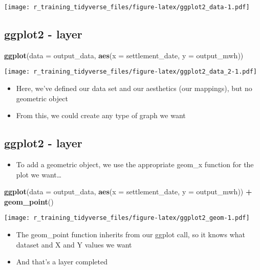 \documentclass[]{article}
\newenvironment{Shaded}{\begin{snugshade}}{\end{snugshade}}
\newcommand{\KeywordTok}[1]{\textcolor[rgb]{0.13,0.29,0.53}{\textbf{#1}}}
\newcommand{\DataTypeTok}[1]{\textcolor[rgb]{0.13,0.29,0.53}{#1}}
\newcommand{\StringTok}[1]{\textcolor[rgb]{0.31,0.60,0.02}{#1}}
\newcommand{\OperatorTok}[1]{\textcolor[rgb]{0.81,0.36,0.00}{\textbf{#1}}}
\newcommand{\NormalTok}[1]{#1}
\providecommand{\tightlist}{%
  \setlength{\itemsep}{0pt}\setlength{\parskip}{0pt}}
\begin{document}
\texttt{[image: r\_training\_tidyverse\_files/figure-latex/ggplot2\_data-1.pdf]}

\subsection{ggplot2 - layer}\label{ggplot2---layer-1}

\begin{Shaded}
\begin{Highlighting}[]
\KeywordTok{ggplot}\NormalTok{(}\DataTypeTok{data =}\NormalTok{ output_data, }\KeywordTok{aes}\NormalTok{(}\DataTypeTok{x =}\NormalTok{ settlement_date, }\DataTypeTok{y =}\NormalTok{ output_mwh))}
\end{Highlighting}
\end{Shaded}

\texttt{[image: r\_training\_tidyverse\_files/figure-latex/ggplot2\_data\_2-1.pdf]}

\begin{itemize}
\tightlist
\item
  Here, we've defined our data set and our aesthetics (our mappings),
  but no geometric object
\item
  From this, we could create any type of graph we want
\end{itemize}

\subsection{ggplot2 - layer}\label{ggplot2---layer-2}

\begin{itemize}
\tightlist
\item
  To add a geometric object, we use the appropriate geom\_x function for
  the plot we want\ldots{}
\end{itemize}

\begin{Shaded}
\begin{Highlighting}[]
\KeywordTok{ggplot}\NormalTok{(}\DataTypeTok{data =}\NormalTok{ output_data, }\KeywordTok{aes}\NormalTok{(}\DataTypeTok{x =}\NormalTok{ settlement_date, }\DataTypeTok{y =}\NormalTok{ output_mwh)) }\OperatorTok{+}\StringTok{ }\KeywordTok{geom_point}\NormalTok{()}
\end{Highlighting}
\end{Shaded}

\texttt{[image: r\_training\_tidyverse\_files/figure-latex/ggplot2\_geom-1.pdf]}

\begin{itemize}
\tightlist
\item
  The geom\_point function inherits from our ggplot call, so it knows
  what dataset and X and Y values we want
\item
  And that's a layer completed
\end{itemize}
\end{document}
